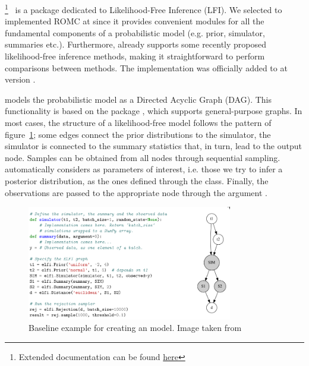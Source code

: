 \footnote{Extended
  documentation can be found
  \href{https://elfi.readthedocs.io/en/latest/}{here}}~\cite{1708.00707}
is a  package dedicated to Likelihood-Free Inference
(LFI). We selected to implemented ROMC at  since it provides
convenient modules for all the fundamental components of a
probabilistic model (e.g. prior, simulator, summaries
etc.). Furthermore,  already supports some recently proposed
likelihood-free inference methods, making it straightforward to
perform comparisons between methods. The implementation was officially
added to  at version .


 models the probabilistic model as a Directed Acyclic Graph
(DAG). This functionality is based on the package ,
which supports general-purpose graphs. In most cases, the structure of
a likelihood-free model follows the pattern of figure~\ref{fig:elfi};
some edges connect the prior distributions to the simulator, the
simulator is connected to the summary statistics that, in turn, lead
to the output node. Samples can be obtained from all nodes through
sequential sampling.  automatically considers as parameters
of interest, i.e. those we try to infer a posterior distribution,
as the ones  defined through the  class. Finally, the
observations are passed to the appropriate node through the argument
.

\begin{figure}[ht]
    \begin{center}
      \includegraphics[width=0.8\textwidth]{./latex_files/images/chapter2/elfi.png}
    \end{center}
    \caption[Baseline example for creating an  model]{Baseline example for creating an  model. Image taken from \cite{1708.00707}}
    \label{fig:elfi}
\end{figure}

